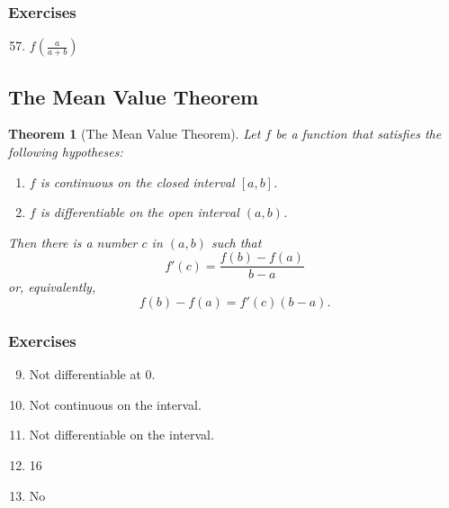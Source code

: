 \documentclass{article}
\newtheorem*{theorem*}{Theorem}
\begin{document}
\subsubsection*{Exercises}
\begin{enumerate}
    \setcounter{enumi}{56}
  \item $f(\frac{a}{a+b})$
\end{enumerate}

\subsection{The Mean Value Theorem}
\begin{theorem*}[The Mean Value Theorem]
  Let $f$ be a function that satisfies the following hypotheses:
  \begin{enumerate}
    \item $f$ is continuous on the closed interval $[a, b]$.
    \item $f$ is differentiable on the open interval $(a, b)$.
  \end{enumerate}
  Then there is a number $c$ in $(a, b)$ such that
  \[f'(c)=\frac{f(b)-f(a)}{b-a}\]
  or, equivalently,
  \[f(b)-f(a)=f'(c)(b-a).\]
\end{theorem*}
\subsubsection*{Exercises}
\begin{enumerate}
    \setcounter{enumi}{8}
  \item Not differentiable at 0.
    \setcounter{enumi}{16}
  \item Not continuous on the interval.
  \item Not differentiable on the interval.
    \setcounter{enumi}{24}
  \item 16
    \setcounter{enumi}{26}
  \item No
\end{enumerate}
\end{document}
